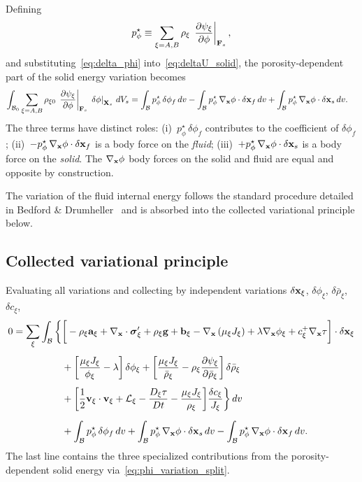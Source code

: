\documentclass[11pt]{article}
\begin{document}
Defining
\begin{equation*}
  p^\star_\phi \equiv \sum_{\xi=A,B} \rho_\xi\,\left.\frac{\partial \psi_\xi}{\partial \phi}\right\vert_{\mathbf{F}_s},
\end{equation*}
and substituting~\eqref{eq:delta_phi} into~\eqref{eq:deltaU_solid}, the porosity-dependent part of the solid energy variation becomes
\begin{align}
  \int_{\mathcal{B}_{0}} \sum_{\xi=A,B} \rho_{\xi 0}\,\left.\frac{\partial \psi_\xi}{\partial \phi}\right\vert_{\mathbf{F}_s}\, \left.\delta\phi\right|_{\mathbf{X}_s}\, dV_s
  &= \int_{\mathcal{B}} p^\star_\phi\, \delta\phi_f \,dv
  - \int_{\mathcal{B}} p^\star_\phi\, \nabla_{\mathbf{x}}\phi \cdot \delta\mathbf{x}_f \,dv
  + \int_{\mathcal{B}} p^\star_\phi\, \nabla_{\mathbf{x}}\phi \cdot \delta\mathbf{x}_s \,dv.
  \label{eq:phi_variation_split}
\end{align}
The three terms have distinct roles: (i)~$p^\star_\phi\,\delta\phi_f$ contributes to the coefficient of $\delta\phi_f$; (ii)~$-p^\star_\phi\,\nabla_{\mathbf{x}}\phi \cdot \delta\mathbf{x}_f$ is a body force on the \emph{fluid}; (iii)~$+p^\star_\phi\,\nabla_{\mathbf{x}}\phi \cdot \delta\mathbf{x}_s$ is a body force on the \emph{solid}.  The $\nabla_{\mathbf{x}}\phi$ body forces on the solid and fluid are equal and opposite by construction.

The variation of the fluid internal energy follows the standard procedure detailed in Bedford \& Drumheller~\cite{drumheller1980thermomechanical} and is absorbed into the collected variational principle below.

\subsection{Collected variational principle}

Evaluating all variations and collecting by independent variations $\delta\mathbf{x}_\xi$, $\delta\phi_\xi$, $\delta\bar\rho_\xi$, $\delta c_\xi$,
\begin{align}
  0 = \sum_\xi \int_{\mathcal{B}} \bigg\{
  &\bigg[-\rho_\xi\mathbf{a}_\xi + \nabla_{\mathbf{x}}\cdot \boldsymbol{\sigma}'_\xi + \rho_\xi\mathbf{g} + \mathbf{b}_\xi
  - \nabla_{\mathbf{x}}\left(\mu_\xi J_\xi\right) + \lambda\nabla_{\mathbf{x}}\phi_\xi + c^+_\xi\nabla_{\mathbf{x}}\tau
  \bigg]\cdot\delta\mathbf{x}_\xi \notag \\[4pt]
  &+ \bigg[\frac{\mu_\xi J_\xi}{\phi_\xi} - \lambda\bigg]\,\delta\phi_\xi
  + \bigg[\frac{\mu_\xi J_\xi}{\bar\rho_\xi} - \rho_\xi\frac{\partial \psi_\xi}{\partial \bar\rho_\xi}\bigg]\,\delta\bar\rho_\xi \notag \\[4pt]
  &+ \bigg[\frac{1}{2}\mathbf{v}_\xi\cdot\mathbf{v}_\xi + \mathcal{L}_\xi - \frac{D_\xi\tau}{Dt} - \frac{\mu_\xi J_\xi}{\rho_\xi}\bigg]\frac{\delta c_\xi}{J_\xi}
  \bigg\} \,dv \notag \\[6pt]
  &+ \int_{\mathcal{B}} p^\star_\phi\, \delta\phi_f \,dv
  + \int_{\mathcal{B}} p^\star_\phi\, \nabla_{\mathbf{x}}\phi \cdot \delta\mathbf{x}_s \,dv
  - \int_{\mathcal{B}} p^\star_\phi\, \nabla_{\mathbf{x}}\phi \cdot \delta\mathbf{x}_f \,dv.
  \label{eq:collected}
\end{align}
The last line contains the three specialized contributions from the porosity-dependent solid energy via~\eqref{eq:phi_variation_split}.
\end{document}
